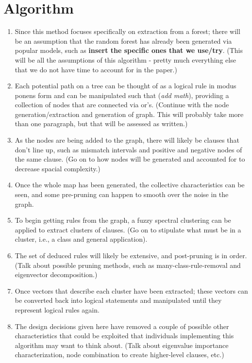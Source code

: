 \documentclass[twoside,11pt]{article}
\begin{document}
\section{Algorithm}
\begin{enumerate}
\item Since this method focuses specifically on extraction from a forest; there will be an assumption that the random forest has already been generated via popular models, such as \textbf{insert the specific ones that we use/try}. (This will be all the assumptions of this algorithm - pretty much everything else that we do not have time to account for in the paper.)
\item Each potential path on a tree can be thought of as a logical rule in modus ponens form and can be manipulated such that (\textit{add math}), providing a collection of nodes that are connected via or's. (Continue with the node generation/extraction and generation of graph. This will probably take more than one paragraph, but that will be assessed as written.)
\item As the nodes are being added to the graph, there will likely be clauses that don't line up, such as mismatch intervals and positive and negative nodes of the same clause. (Go on to how nodes will be generated and accounted for to decrease spacial complexity.)
\item Once the whole map has been generated, the collective characteristics can be seen, and some pre-pruning can happen to smooth over the noise in the graph. 
\item To begin getting rules from the graph, a fuzzy spectral clustering can be applied to extract clusters of clauses. (Go on to stipulate what must be in a cluster, i.e., a class and general application). 
\item The set of deduced rules will likely be extensive, and post-pruning is in order. (Talk about possible pruning methods, such as many-class-rule-removal and eigenvector decomposition.)
\item Once vectors that describe each cluster have been extracted; these vectors can be converted back into logical statements and manipulated until they represent logical rules again.
\item The design decisions given here have removed a couple of possible other characteristics that could be exploited that individuals implementing this algorithm may want to think about. (Talk about eigenvalue importance characterization, node combination to create higher-level clauses, etc.)
\end{enumerate}
\end{document}
